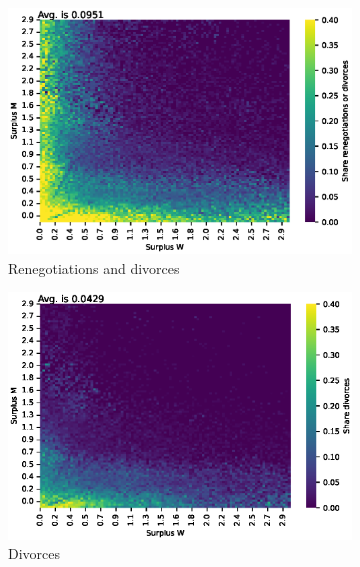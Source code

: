 \documentclass[]{article}
\begin{document}
\begin{figure}[H]
	\centering
	\begin{subfigure}{0.49\textwidth} %
		\centering
		\includegraphics[width=\textwidth]{surp_ren_div.eps} %
		\caption{Renegotiations and divorces}
		\label{fig:picture1}
	\end{subfigure}
	\begin{subfigure}{0.49\textwidth}
		\centering
		\includegraphics[width=\textwidth]{surp_div.eps} %
		\caption{Divorces}
		\label{fig:picture2}
	\end{subfigure}
	\begin{subfigure}{0.49\textwidth}
		\centering

\end{subfigure}
\end{figure}
\end{document}
